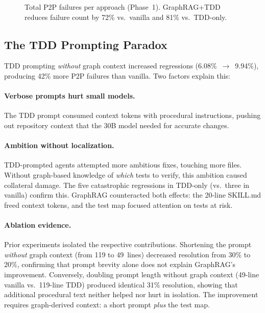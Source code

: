 \documentclass[sigconf,nonacm]{acmart}
\begin{document}
\begin{figure}[t]
\centering
{}
\caption{Total P2P failures per approach (Phase~1).  GraphRAG+TDD reduces
  failure count by 72\% vs.\ vanilla and 81\% vs.\ TDD-only.}
\label{fig:p2p}
\end{figure}

\subsection{The TDD Prompting Paradox}
\label{sec:paradox}

TDD prompting \emph{without} graph context increased regressions
(6.08\%~$\to$~9.94\%), producing 42\% more P2P failures than
vanilla.  Two factors explain this:

\paragraph{Verbose prompts hurt small models.}
The TDD prompt consumed context tokens with procedural instructions, pushing
out repository context that the 30B model needed for accurate changes.

\paragraph{Ambition without localization.}
TDD-prompted agents attempted more ambitious fixes, touching more files.
Without graph-based knowledge of \emph{which} tests to verify, this ambition
caused collateral damage.  The five catastrophic regressions in TDD-only
(vs.\ three in vanilla) confirm this.  GraphRAG counteracted both effects:
the 20-line SKILL.md freed context tokens, and the test map focused attention
on tests at risk.

\paragraph{Ablation evidence.}
Prior experiments isolated the respective contributions.  Shortening the
prompt \emph{without} graph context (from 119 to 49~lines) decreased
resolution from 30\% to 20\%, confirming that prompt brevity alone does
not explain GraphRAG's improvement.  Conversely, doubling prompt length
without graph context (49-line vanilla vs.\ 119-line TDD) produced
identical 31\% resolution, showing that additional procedural text neither
helped nor hurt in isolation.  The improvement requires graph-derived
context: a short prompt \emph{plus} the test map.
\end{document}
